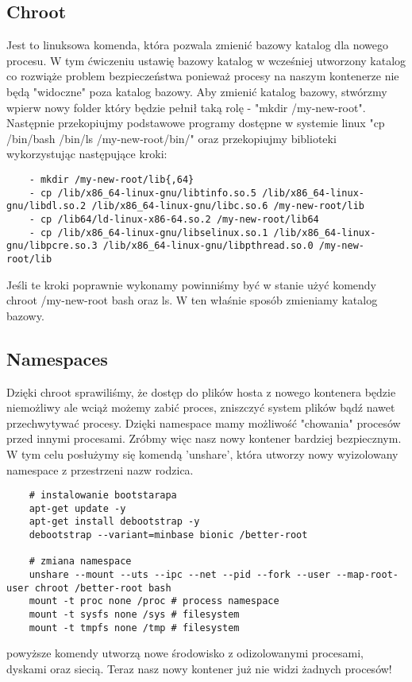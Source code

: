 \subsection{Chroot}
Jest to linuksowa komenda, która pozwala zmienić bazowy katalog dla nowego procesu. W tym ćwiczeniu ustawię bazowy katalog w wcześniej utworzony katalog co rozwiąże problem bezpieczeństwa ponieważ procesy na naszym kontenerze nie będą "widoczne" poza katalog bazowy. 
Aby zmienić katalog bazowy, stwórzmy wpierw nowy folder który będzie pełnił taką rolę - "mkdir /my-new-root". Następnie przekopiujmy podstawowe programy dostępne w systemie linux "cp /bin/bash /bin/ls /my-new-root/bin/" oraz przekopiujmy biblioteki wykorzystując następujące kroki:
\begin{lstlisting}
    - mkdir /my-new-root/lib{,64}
    - cp /lib/x86_64-linux-gnu/libtinfo.so.5 /lib/x86_64-linux-gnu/libdl.so.2 /lib/x86_64-linux-gnu/libc.so.6 /my-new-root/lib
    - cp /lib64/ld-linux-x86-64.so.2 /my-new-root/lib64
    - cp /lib/x86_64-linux-gnu/libselinux.so.1 /lib/x86_64-linux-gnu/libpcre.so.3 /lib/x86_64-linux-gnu/libpthread.so.0 /my-new-root/lib
\end{lstlisting}
Jeśli te kroki poprawnie wykonamy powinniśmy być w stanie użyć komendy chroot /my-new-root bash oraz ls. W ten właśnie sposób zmieniamy katalog bazowy. 
\subsection{Namespaces}
Dzięki chroot sprawiliśmy, że dostęp do plików hosta z nowego kontenera będzie niemożliwy ale wciąż możemy zabić proces, zniszczyć system plików bądź nawet przechwytywać procesy. 
Dzięki namespace mamy możliwość "chowania" procesów przed innymi procesami. 
Zróbmy więc nasz nowy kontener bardziej bezpiecznym. W tym celu posłużymy się komendą 'unshare', która utworzy nowy wyizolowany namespace z przestrzeni nazw rodzica.

\begin{lstlisting}
    # instalowanie bootstarapa
    apt-get update -y
    apt-get install debootstrap -y
    debootstrap --variant=minbase bionic /better-root

    # zmiana namespace
    unshare --mount --uts --ipc --net --pid --fork --user --map-root-user chroot /better-root bash 
    mount -t proc none /proc # process namespace
    mount -t sysfs none /sys # filesystem
    mount -t tmpfs none /tmp # filesystem
\end{lstlisting}
powyższe komendy utworzą nowe środowisko z odizolowanymi procesami, dyskami oraz siecią. Teraz nasz nowy kontener już nie widzi żadnych procesów!
